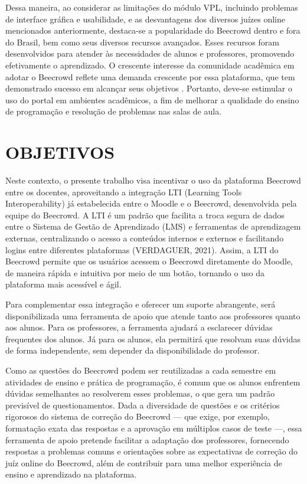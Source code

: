Dessa maneira, ao considerar as limitações do módulo VPL, incluindo problemas de interface gráfica e usabilidade, e as desvantagens dos diversos juízes online mencionados anteriormente, destaca-se a popularidade do Beecrowd dentro e fora do Brasil, bem como seus diversos recursos avançados. Esses recursos foram desenvolvidos para atender às necessidades de alunos e professores, promovendo efetivamente o aprendizado. O crescente interesse da comunidade acadêmica em adotar o Beecrowd reflete uma demanda crescente por essa plataforma, que tem demonstrado sucesso em alcançar seus objetivos \cite[p.~31]{ferreira2022}. Portanto, deve-se estimular o uso do portal em ambientes acadêmicos, a fim de melhorar a qualidade do ensino de programação e resolução de problemas nas salas de aula.

\section{OBJETIVOS}

Neste contexto, o presente trabalho visa incentivar o uso da plataforma Beecrowd entre os docentes, aproveitando a integração LTI (Learning Tools Interoperability) já estabelecida entre o Moodle e o Beecrowd, desenvolvida pela equipe do Beecrowd. A LTI é um padrão que facilita a troca segura de dados entre o Sistema de Gestão de Aprendizado (LMS) e ferramentas de aprendizagem externas, centralizando o acesso a conteúdos internos e externos e facilitando logins entre diferentes plataformas (VERDAGUER, 2021). Assim, a LTI do Beecrowd permite que os usuários acessem o Beecrowd diretamente do Moodle, de maneira rápida e intuitiva por meio de um botão, tornando o uso da plataforma mais acessível e ágil.

Para complementar essa integração e oferecer um suporte abrangente,  será disponibilizada uma ferramenta de apoio que atende tanto aos professores quanto aos alunos. Para os professores, a ferramenta ajudará a esclarecer dúvidas frequentes dos alunos. Já para os alunos, ela permitirá que resolvam suas dúvidas de forma independente, sem depender da disponibilidade do professor.

Como as questões do Beecrowd podem ser reutilizadas a cada semestre em atividades de ensino e prática de programação, é comum que os alunos enfrentem dúvidas semelhantes ao resolverem esses problemas, o que gera um padrão previsível de questionamentos. Dada a diversidade de questões e os critérios rigorosos do sistema de correção do Beecrowd — que exige, por exemplo, formatação exata das respostas e a aprovação em múltiplos casos de teste —, essa ferramenta de apoio pretende facilitar a adaptação dos professores, fornecendo respostas a problemas comuns e orientações sobre as expectativas de correção do juíz online do Beecrowd, além de contribuir para uma melhor experiência de ensino e aprendizado na plataforma.

